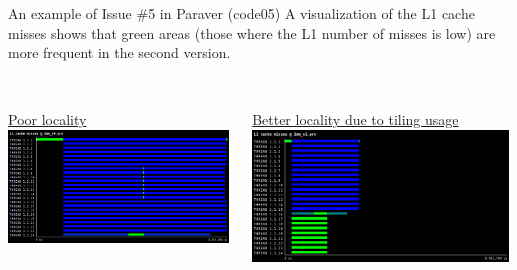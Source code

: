 \documentclass[10pt,xcolor=table]{beamer}
\begin{document}
\begin{frame}{An example of Issue \#5 in Paraver (code05)}
A visualization of the L1 cache misses shows that green areas (those where the L1 number of misses is low) are more frequent in the second version.
\centering
\begin{columns}
\begin{column}{0.5\textwidth}
\\\underline{Poor locality}
\includegraphics[width=0.99\textwidth]{figs/L1_cache_misses@2mm_v0.png}
 \end{column}
 \begin{column}{0.5\textwidth}
 \\\underline{Better locality due to tiling usage}
\includegraphics[width=0.99\textwidth]{figs/L1_cache_misses@2mm_v1.png}
 \end{column}
\end{columns}
\end{frame}
\end{document}
